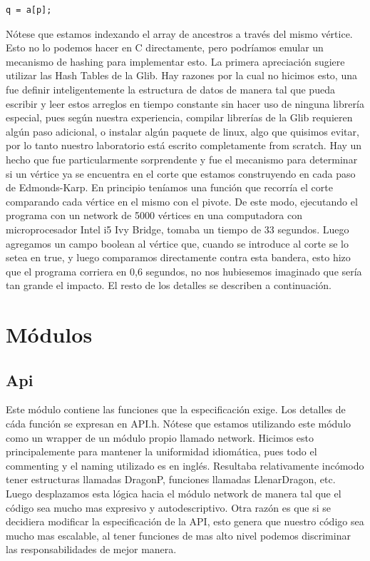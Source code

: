 \documentclass[11pt]{article}
\begin{document}
\begin{verbatim}
q = a[p];
\end{verbatim}
Nótese que estamos indexando el array de ancestros a través del mismo
vértice. Esto no lo podemos hacer en C directamente, pero podríamos
emular un mecanismo de hashing para implementar esto. La primera
apreciación sugiere utilizar las Hash Tables de la Glib. Hay razones
por la cual no hicimos esto, una fue definir inteligentemente la
estructura de datos de manera tal que pueda escribir y leer estos
arreglos en tiempo constante sin hacer uso de ninguna librería
especial, pues según nuestra experiencia, compilar librerías de la
Glib requieren algún paso adicional, o instalar algún paquete de
linux, algo que quisimos evitar, por lo tanto nuestro laboratorio
está escrito completamente from scratch.
Hay un hecho que fue particularmente sorprendente y fue el mecanismo
para determinar si un vértice ya se encuentra en el corte que estamos
construyendo en cada paso de Edmonds-Karp. En principio teníamos una
función que recorría el corte comparando cada vértice en el mismo con
el pivote. De este modo, ejecutando el programa con un network de 5000
vértices en una computadora
con microprocesador Intel i5 Ivy Bridge, tomaba un tiempo de 33
segundos. Luego agregamos un campo boolean al vértice que, cuando se
introduce al corte se lo setea en true, y luego comparamos
directamente contra esta bandera, esto hizo que el programa corriera
en 0,6 segundos, no nos hubiesemos imaginado que sería tan grande el
impacto.
El resto de los detalles se describen a continuación.
\section{Módulos}
\label{sec-4}
\subsection{Api}
\label{sec-4-1}

Este módulo contiene las funciones que la especificación exige. 
Los detalles de cáda función se expresan en API.h. Nótese que estamos
utilizando este módulo como un wrapper de un módulo propio llamado
network. Hicimos esto principalemente para mantener la uniformidad
idiomática, pues todo el commenting y el naming utilizado es en
inglés. Resultaba relativamente incómodo tener estructuras llamadas
DragonP, funciones llamadas LlenarDragon, etc. Luego desplazamos esta
lógica hacia el módulo network de manera tal que el código sea mucho
mas expresivo y autodescriptivo. Otra razón es que si se decidiera
modificar la especificación de la API, esto genera que nuestro código
sea mucho mas escalable, al tener funciones de mas alto nivel podemos
discriminar las responsabilidades de mejor manera.
\end{document}
